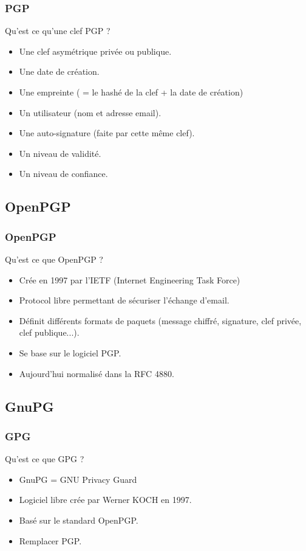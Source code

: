 \begin{frame}
    \frametitle{\color{white}PGP}
    \begin{block}{Qu'est ce qu'une clef PGP ?}
    	\begin{itemize}
	  \item Une clef asymétrique privée ou publique.
	  \item Une date de création.
	  \item Une empreinte ( = le hashé de la clef + la date de création)
	  \item Un utilisateur (nom et adresse email).
	  \item Une auto-signature (faite par cette même clef).
	  \item Un niveau de validité.
	  \item Un niveau de confiance.
       \end{itemize} 
    \end{block}
\end{frame}

\subsection{OpenPGP}
\begin{frame}
    \frametitle{\color{white}OpenPGP}
    \begin{block}{Qu'est ce que OpenPGP ?}
    	\begin{itemize}
    	 \item Crée en 1997 par l'IETF (Internet Engineering Task Force)
    	 \item Protocol libre permettant de sécuriser l'échange d'email.
    	 \item Définit différents formats de paquets (message chiffré, signature, clef privée, clef publique...).
    	 \item Se base sur le logiciel PGP.
         \item Aujourd'hui normalisé dans la RFC 4880.
       \end{itemize} 
    \end{block}
\end{frame}

\subsection{GnuPG}
\begin{frame}
    \frametitle{\color{white}GPG}
    \begin{block}{Qu'est ce que GPG ?}
      \begin{itemize}
        \item GnuPG = GNU Privacy Guard
        \item Logiciel libre crée par Werner KOCH en 1997.
        \item Basé sur le standard OpenPGP.
        \item Remplacer PGP.
      \end{itemize}
    \end{block}
\end{frame}